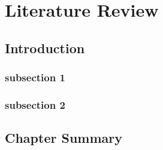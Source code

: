 \chapter{Literature Review}\label{chapter2}

\section{Introduction}

\subsection{subsection 1}
\subsection{subsection 2}


\section{Chapter Summary} \label{chapter2_summary}
